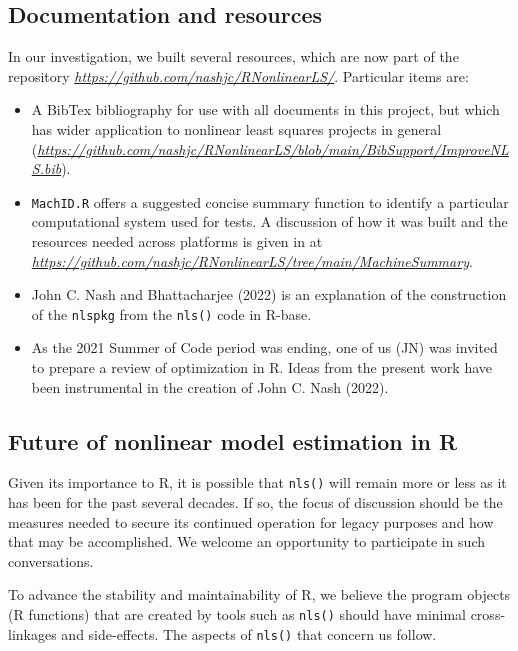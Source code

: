 \hypertarget{documentation-and-resources}{%
\subsection{Documentation and resources}\label{documentation-and-resources}}

In our investigation, we built several resources, which are now part of
the repository \emph{\url{https://github.com/nashjc/RNonlinearLS/}}. Particular items
are:

\begin{itemize}
\item
  A BibTex bibliography for use with all documents in this project, but which
  has wider application to nonlinear least squares projects in general
  (\emph{\url{https://github.com/nashjc/RNonlinearLS/blob/main/BibSupport/ImproveNLS.bib}}).
\item
  \texttt{MachID.R} offers a suggested concise summary function
  to identify a particular computational system used for tests. A discussion
  of how it was built and the resources needed across platforms is given in
  at \emph{\url{https://github.com/nashjc/RNonlinearLS/tree/main/MachineSummary}}.
\item
  John C. Nash and Bhattacharjee (2022) is an explanation of the construction of the \texttt{nlspkg} from the
  \texttt{nls()} code in R-base.
\item
  As the 2021 Summer of Code period was ending, one of us (JN) was invited to prepare
  a review of optimization in R. Ideas from the present work have been instrumental
  in the creation of John C. Nash (2022).
\end{itemize}

\hypertarget{future-of-nonlinear-model-estimation-in-r}{%
\subsection{Future of nonlinear model estimation in R}\label{future-of-nonlinear-model-estimation-in-r}}

Given its importance to R, it is possible that \texttt{nls()} will remain more or less
as it has been for the past several decades. If so, the focus of discussion
should be the measures needed to secure its continued operation for legacy
purposes and how that may be accomplished.
We welcome an opportunity to participate in such conversations.

To advance the stability and maintainability of R, we believe the program
objects (R functions)
that are created by tools such as \texttt{nls()} should have minimal
cross-linkages and side-effects.
The aspects of \texttt{nls()} that concern us follow.

